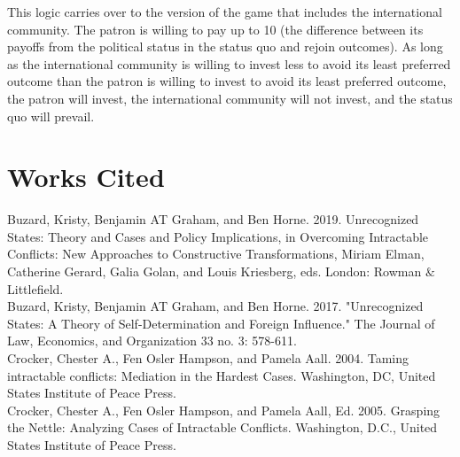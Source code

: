 \documentclass[12pt]{article}
\begin{document}
This logic carries over to the version of the game that includes the international community. The patron is willing to pay up to 10 (the difference between its payoffs from the political status in the status quo and rejoin outcomes). As long as the international community is willing to invest less to avoid its least preferred outcome than the patron is willing to invest to avoid its least preferred outcome, the patron will invest, the international community will not invest, and the status quo will prevail.

\section{Works Cited}

Buzard, Kristy, Benjamin AT Graham, and Ben Horne. 2019. Unrecognized States: Theory and Cases and Policy Implications, in Overcoming Intractable Conflicts: New Approaches to Constructive Transformations, Miriam Elman, Catherine Gerard, Galia Golan, and Louis Kriesberg, eds. London: Rowman $\&$ Littlefield.\\

Buzard, Kristy, Benjamin AT Graham, and Ben Horne. 2017. "Unrecognized States: A Theory of Self-Determination and Foreign Influence." The Journal of Law, Economics, and Organization 33 no. 3: 578-611.\\

Crocker, Chester A., Fen Osler Hampson, and Pamela Aall. 2004. Taming intractable conflicts: Mediation in the Hardest Cases. Washington, DC, United States Institute of Peace Press. \\

Crocker, Chester A., Fen Osler Hampson, and Pamela Aall, Ed. 2005. Grasping the Nettle: Analyzing Cases of Intractable Conflicts. Washington, D.C., United States Institute of Peace Press.\\
\end{document}
